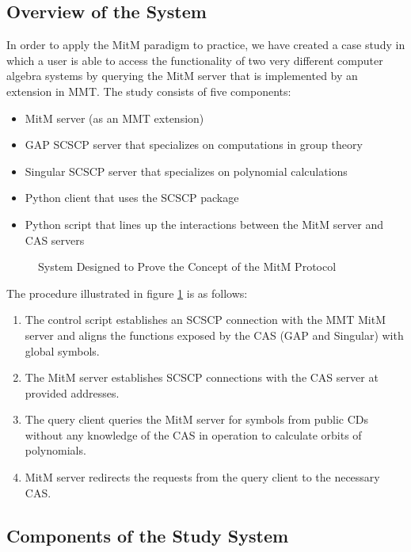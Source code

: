 \subsection{Overview of the System}
In order to apply the MitM paradigm to practice, we have created a case study 
\cite{MitM-PoC} in which a user is able to access the functionality of two very 
different computer algebra systems by querying the MitM server that is 
implemented by an extension in MMT. The study consists of five components:
\begin{itemize}
  \item MitM server (as an MMT extension)
  \item GAP SCSCP server that specializes on computations in group theory
  \item Singular SCSCP server that specializes on polynomial calculations
  \item Python client that uses the SCSCP package
  \item Python script that lines up the interactions between the MitM server and CAS servers
\end{itemize}

\begin{figure}[ht]\centering
  
  \caption[GAP-Singular MitM Interaction]{
    System Designed to Prove the Concept of the MitM Protocol
  }\label{fig:mitmpoc}
\end{figure}

The procedure illustrated in figure \ref{fig:mitmpoc} is as follows:
\begin{enumerate}
  \item The control script establishes an SCSCP connection with the MMT MitM 
    server and aligns the functions exposed by the CAS (GAP and Singular) with
    global symbols.
  \item The MitM server establishes SCSCP connections with the CAS server at
    provided addresses.
  \item The query client queries the MitM server for symbols from public CDs
    without any knowledge of the CAS in operation to calculate orbits of 
    polynomials.
  \item MitM server redirects the requests from the query client to the necessary
    CAS.
\end{enumerate}

\subsection{Components of the Study System}

